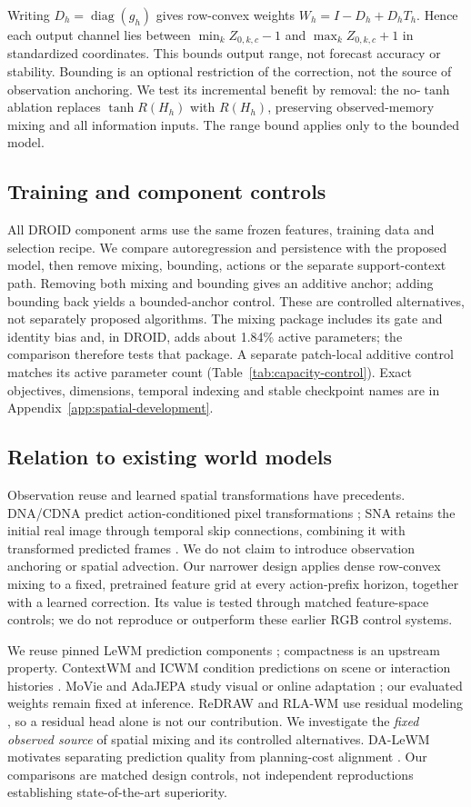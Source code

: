 Writing $D_h=\operatorname{diag}(g_h)$ gives row-convex weights
$W_h=I-D_h+D_hT_h$. Hence each output channel lies between
$\min_k Z_{0,k,c}-1$ and $\max_k Z_{0,k,c}+1$ in standardized coordinates.
This bounds output range, not forecast accuracy or stability. Bounding is an optional restriction of the correction, not the source of
observation anchoring. We test its incremental benefit by removal: the no-$\tanh$ ablation replaces
$\tanh R(H_h)$ with $R(H_h)$, preserving observed-memory mixing and all information
inputs. The range bound applies only to the bounded model.

\subsection{Training and component controls}
All DROID component arms use the same frozen features, training data and selection
recipe. We compare autoregression and persistence with the proposed model,
then remove mixing, bounding, actions or the separate support-context path.
Removing both mixing and bounding gives an additive anchor; adding bounding
back yields a bounded-anchor control. These are controlled alternatives,
not separately proposed algorithms. The mixing package includes its gate and
identity bias and, in DROID, adds about 1.84\% active parameters; the comparison therefore
tests that package. A separate patch-local additive control matches its active
parameter count (Table~\ref{tab:capacity-control}).
Exact objectives, dimensions, temporal indexing and stable checkpoint names
are in Appendix~\ref{app:spatial-development}.

\subsection{Relation to existing world models}
Observation reuse and learned spatial transformations have precedents.
DNA/CDNA predict action-conditioned pixel transformations
\citep{finn2016advection}; SNA retains the initial real image through temporal
skip connections, combining it with transformed predicted frames
\citep{ebert2017skip}. We do not claim to introduce observation anchoring or
spatial advection. Our narrower design applies dense row-convex mixing to a
fixed, pretrained feature grid at every action-prefix horizon, together with
a learned correction. Its value is tested through matched feature-space
controls; we do not reproduce or outperform these earlier RGB control systems.

We reuse pinned LeWM prediction components \citep{maes2026lewm,maes2026stable};
compactness is an upstream property. ContextWM and ICWM condition predictions
on scene or interaction histories \citep{wu2023contextwm,wang2026icwm}.
MoVie and AdaJEPA study visual or online adaptation
\citep{yang2023movie,wang2026adajepa}; our evaluated weights remain fixed at
inference. ReDRAW and RLA-WM use residual modeling
\citep{lanier2025redraw,zhang2026rlawm}, so a residual head alone is not our
contribution. We investigate the \emph{fixed observed source} of spatial mixing
and its controlled alternatives. DA-LeWM motivates separating prediction
quality from planning-cost alignment \citep{wang2026dalewm}. Our comparisons
are matched design controls, not independent reproductions establishing
state-of-the-art superiority.
